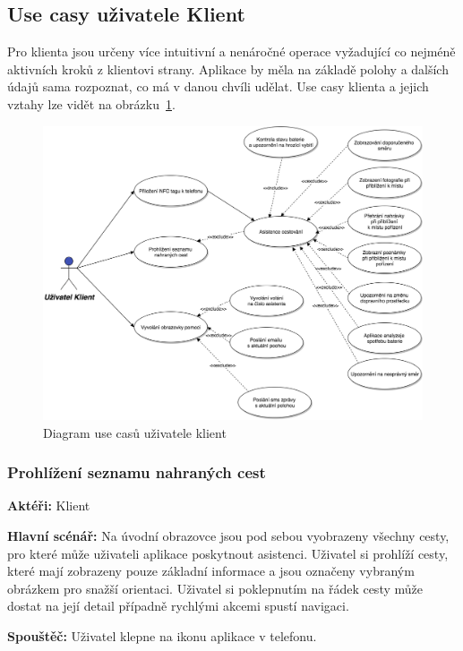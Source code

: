 \documentclass{article}
\newcommand{\usecase}[2]{\subsubsection{#1}\label{#2}}
\begin{document}
\subsection{Use casy uživatele Klient}
Pro klienta jsou určeny více intuitivní a nenáročné operace vyžadující co nejméně aktivních
kroků z klientovi strany. Aplikace by měla na základě polohy a dalších údajů sama rozpoznat,
co má v danou chvíli udělat. Use casy klienta a jejich vztahy lze vidět na obrázku~\ref{fig:UseCasesClient}.

\begin{figure}[H]
        \centering
                \includegraphics[scale=0.2]{img/UseCasesClient.png}
        \caption{Diagram use casů uživatele klient}
        \label{fig:UseCasesClient}
\end{figure}


\usecase{Prohlížení seznamu nahraných cest}{prohlizeniklient}
\textbf{Aktéři:} Klient

\vspace{0.1cm}
\noindent
\textbf{Hlavní scénář:} Na úvodní obrazovce jsou pod sebou vyobrazeny všechny cesty, pro které může
uživateli aplikace poskytnout asistenci. Uživatel si prohlíží cesty, které mají zobrazeny pouze
základní informace a jsou označeny vybraným obrázkem pro snažší orientaci. Uživatel si poklepnutím
na řádek cesty může dostat na její detail případně rychlými akcemi spustí navigaci.

\vspace{0.1cm}
\noindent
\textbf{Spouštěč:} Uživatel klepne na ikonu aplikace v telefonu.
\end{document}
